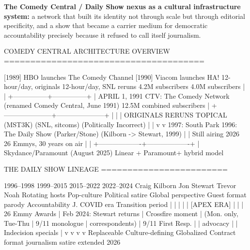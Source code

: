 \documentclass[11pt,letterpaper]{article}
\begin{document}
\textbf{The Comedy Central / Daily Show nexus as a cultural infrastructure system:} a network that built its identity not through scale but through editorial specificity, and a show that became a carrier medium for democratic accountability precisely because it refused to call itself journalism.

\begin{asciibox}
COMEDY CENTRAL ARCHITECTURE OVERVIEW
======================================

[1989]  HBO launches The Comedy Channel      [1990]  Viacom launches HA!
         12-hour/day, originals                      12-hour/day, SNL reruns
         4.2M subscribers                            4.0M subscribers
                    |                                       |
                    +---------------+---------------+
                                    |
                             APRIL 1, 1991
                        CTV: The Comedy Network
                        (renamed Comedy Central, June 1991)
                        12.5M combined subscribers
                                    |
              +---------------------+---------------------+
              |                     |                     |
         ORIGINALS              RERUNS                TOPICAL
         (MST3K)             (SNL, sitcoms)       (Politically Incorrect)
              |                                           |
              v                                           v
         1997: South Park                     1996: The Daily Show
         (Parker/Stone)                       (Kilborn -> Stewart, 1999)
              |                                           |
         Still airing 2026                    26 Emmys, 30 years on air
              |                                           |
              +-------------------+-------------------+
                                  |
                    Skydance/Paramount (August 2025)
                    Linear + Paramount+ hybrid model
\end{asciibox}

\begin{asciibox}
THE DAILY SHOW LINEAGE
========================

  1996--1998       1999--2015          2015--2022          2022--2024
  Craig Kilborn    Jon Stewart         Trevor Noah         Rotating hosts
  Pop-culture      Political satire    Global perspective  Guest format
  parody           Accountability J.   COVID era           Transition period
       |                 |                  |                   |
       |            [APEX ERA]              |                   |
       |         26 Emmy Awards             |          Feb 2024: Stewart returns
       |         Crossfire moment           |          (Mon. only, Tue-Thu
       |         9/11 monologue             |           correspondents)
       |         9/11 First Resp.           |
       |         advocacy                   |
       |         Indecision specials        |
       v                 v                  v                   v
  Replaceable      Culture-defining    Globalized           Contract
  format           journalism          satire               extended 2026
\end{asciibox}
\end{document}
